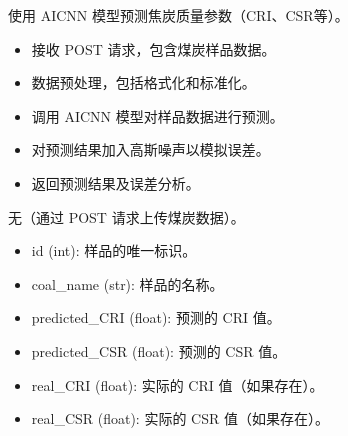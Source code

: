 \documentclass[a4paper,12pt,english]{sphinxmanual}
\begin{document}

\begin{fulllineitems}
\label{\detokenize{api/login:login.getCokeQualityfyeResultAIXGBoost}}
\pysigstartsignatures
{}
\pysigstopsignatures
\sphinxAtStartPar
使用 AICNN 模型预测焦炭质量参数（CRI、CSR等）。
\begin{description}
\begin{itemize}
\item {} 
\sphinxAtStartPar
接收 POST 请求，包含煤炭样品数据。

\item {} 
\sphinxAtStartPar
数据预处理，包括格式化和标准化。

\item {} 
\sphinxAtStartPar
调用 AICNN 模型对样品数据进行预测。

\item {} 
\sphinxAtStartPar
对预测结果加入高斯噪声以模拟误差。

\item {} 
\sphinxAtStartPar
返回预测结果及误差分析。

\end{itemize}

\sphinxAtStartPar
无（通过 POST 请求上传煤炭数据）。

\begin{description}
\begin{itemize}
\item {} 
\sphinxAtStartPar
id (int): 样品的唯一标识。

\item {} 
\sphinxAtStartPar
coal\_name (str): 样品的名称。

\item {} 
\sphinxAtStartPar
predicted\_CRI (float): 预测的 CRI 值。

\item {} 
\sphinxAtStartPar
predicted\_CSR (float): 预测的 CSR 值。

\item {} 
\sphinxAtStartPar
real\_CRI (float): 实际的 CRI 值（如果存在）。

\item {} 
\sphinxAtStartPar
real\_CSR (float): 实际的 CSR 值（如果存在）。


\end{itemize}
\end{description}
\end{description}
\end{fulllineitems}
\end{document}
